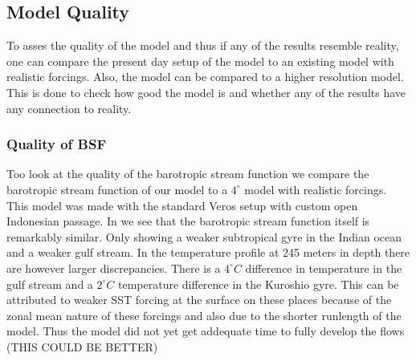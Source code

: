 \subsection{Model Quality}
To asses the quality of the model and thus if any of the results resemble reality, one can compare the present day setup of the model to an existing model with realistic forcings. Also, the model can be compared to a higher resolution model. This is done to check how good the model is and whether any of the results have any connection to reality.

\subsubsection{Quality of BSF}
Too look at the quality of the barotropic stream function we compare the barotropic stream function of our model to a $4^{\circ}$ model with realistic forcings. This model was made with the standard Veros setup with custom open Indonesian passage. In  we see that the barotropic stream function itself is remarkably similar. Only showing a weaker subtropical gyre in the Indian ocean and a weaker gulf stream. In the temperature profile at 245 meters in depth there are however larger discrepancies. There is a $4^{\circ}C$ difference in temperature in the gulf stream and a $2^{\circ}C$ temperature difference in the Kuroshio gyre. This can be attributed to weaker SST forcing at the surface on these places because of the zonal mean nature of these forcings and also due to the shorter runlength of the model. Thus the model did not yet get addequate time to fully develop the flows (THIS COULD BE BETTER)

